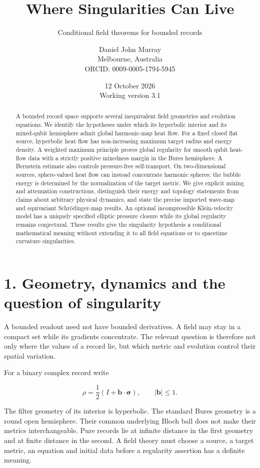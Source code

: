 \documentclass[
  11pt,
  a4paper,
]{article}
\title{Where Singularities Can Live}
\subtitle{Conditional field theorems for bounded records}
\author{Daniel John Murray\\{\small Melbourne, Australia}\\{\small ORCID: 0009-0005-1794-5945}}
\date{12 October 2026\\{\small Working version 3.1}}
\begin{document}
\maketitle
\begin{abstract}
A bounded record space supports several inequivalent field geometries and evolution equations. We identify the hypotheses under which its hyperbolic interior and its mixed-qubit hemisphere admit global harmonic-map heat flow. For a fixed closed flat source, hyperbolic heat flow has non-increasing maximum target radius and energy density. A weighted maximum principle proves global regularity for smooth qubit heat-flow data with a strictly positive mixedness margin in the Bures hemisphere. A Bernstein estimate also controls pressure-free self-transport. On two-dimensional sources, sphere-valued heat flow can instead concentrate harmonic spheres; the bubble energy is determined by the normalization of the target metric. We give explicit mixing and attenuation constructions, distinguish their energy and topology statements from claims about arbitrary physical dynamics, and state the precise imported wave-map and equivariant Schrödinger-map results. An optional incompressible Klein-velocity model has a uniquely specified elliptic pressure closure while its global regularity remains conjectural. These results give the singularity hypothesis a conditional mathematical meaning without extending it to all field equations or to spacetime curvature singularities.
\end{abstract}

\section{1. Geometry, dynamics and the question of singularity}\label{geometry-dynamics-and-the-question-of-singularity}

A bounded readout need not have bounded derivatives. A field may stay in a compact set while its gradients concentrate. The relevant question is therefore not only where the values of a record lie, but which metric and evolution control their spatial variation.

For a binary complex record write

\[
\rho=\frac12(I+\mathbf b\cdot\boldsymbol\sigma),\qquad |\mathbf b|\leq1.
\]

The filter geometry of its interior is hyperbolic. The standard Bures geometry is a round open hemisphere. Their common underlying Bloch ball does not make their metrics interchangeable. Pure records lie at infinite distance in the first geometry and at finite distance in the second. A field theory must choose a source, a target metric, an equation and initial data before a regularity assertion has a definite meaning.
\end{document}

